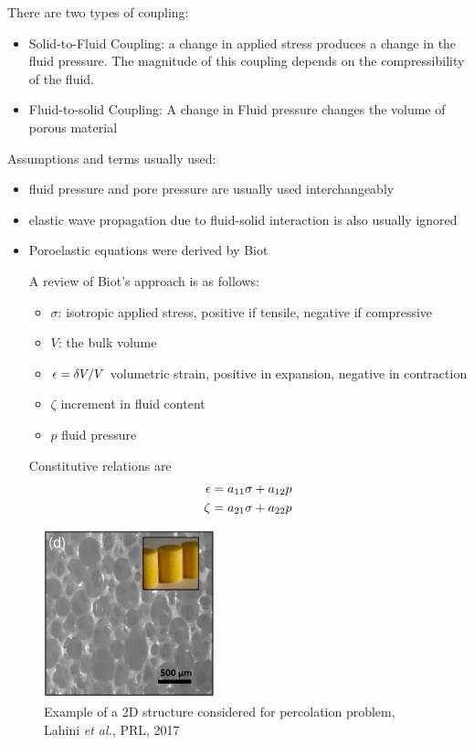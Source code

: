 There are two types of coupling:
%
\begin{itemize}
  \item Solid-to-Fluid Coupling: a change in applied stress produces a
    change in the fluid pressure. The magnitude of this coupling
    depends on the compressibility of the fluid. 
  \item Fluid-to-solid Coupling: A change in Fluid pressure changes the volume of porous material
\end{itemize}
%

Assumptions and terms usually used:
%
\begin{itemize}
\item fluid pressure and pore pressure are usually used
  interchangeably
 \item elastic wave propagation due to fluid-solid interaction is also
   usually ignored
\end{itemize}


\begin{itemize}
\item Poroelastic equations were derived by Biot
  \cite[][]{biot_general_1941,biot_theory_1955,biot_theory_1956}

  A review of Biot's approach is as follows:
  \begin{itemize}
  \item $\sigma$: isotropic applied stress, positive if tensile,
    negative if compressive
   \item $V$: the bulk volume
   \item $\epsilon = \delta V/V$ volumetric strain, positive in expansion,
     negative in contraction
   \item $\zeta$ increment in fluid content
   \item $p$ fluid pressure
   \end{itemize}
   Constitutive relations are
   \begin{align}
     \epsilon &= a_{11} \sigma + a_{12} p \\
     \zeta &= a_{21} \sigma + a_{22} p 
   \end{align}
\end{itemize}


\begin{figure}[h]
  \centering
  \includegraphics[width=5cm]{Figs/poroelasticity-crumble}
  \caption{Example of a 2D structure considered for percolation
    problem, Lahini \textit{et al.}, PRL, 2017 } \label{fig-soft-hard}
\end{figure}


